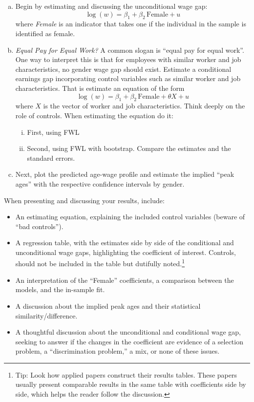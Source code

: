 \documentclass[12pt,a4paper,onecolumn]{article}
\begin{document}
\begin{enumerate}[(a)]
  \item Begin by estimating and discussing the unconditional wage gap:
  \begin{equation}
  \log(w) = \beta_1 + \beta_2 \,\text{Female} + u
  \end{equation}
  where \textit{Female} is an indicator that takes one if the individual in the sample is identified as female.

  \item \textit{Equal Pay for Equal Work?} A common slogan is ``equal pay for equal work''. One way to interpret this is that for employees with similar worker and job characteristics, no gender wage gap should exist. Estimate a conditional earnings gap incorporating control variables such as similar worker and job characteristics. That is estimate an equation of the form
  \begin{equation}
  \log(w) = \beta_1 + \beta_2 \,\text{Female} + \theta X + u
  \end{equation}
  where $X$ is the vector of worker and job characteristics. Think deeply on the role of controls. When estimating the equation do it:
  \begin{enumerate}[i.]
    \item First, using FWL
    \item Second, using FWL with bootstrap. Compare the estimates and the standard errors.
  \end{enumerate}

  \item Next, plot the predicted age-wage profile and estimate the implied ``peak ages'' with the respective confidence intervals by gender.
\end{enumerate}

When presenting and discussing your results, include:
\begin{itemize}
  \item An estimating equation, explaining the included control variables (beware of ``bad controls'').
  \item A regression table, with the estimates side by side of the conditional and unconditional wage gaps, highlighting the coefficient of interest. Controls, should not be included in the table but dutifully noted.\footnote{Tip: Look how applied papers construct their results tables. These papers usually present comparable results in the same table with coefficients side by side, which helps the reader follow the discussion.}
  \item An interpretation of the ``Female'' coefficients, a comparison between the models, and the in-sample fit.
  \item A discussion about the implied peak ages and their statistical similarity/difference.
  \item A thoughtful discussion about the unconditional and conditional wage gap, seeking to answer if the changes in the coefficient are evidence of a selection problem, a ``discrimination problem,'' a mix, or none of these issues.
\end{itemize}
\end{document}
